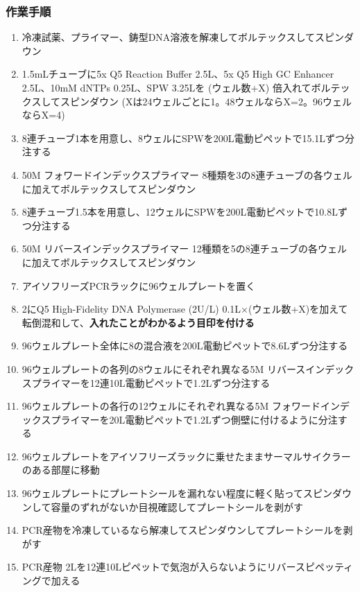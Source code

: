 \documentclass[titlepage,10pt,a4paper,uplatex]{jsbook}
\renewcommand{\textbf}[1]{{\bfseries\sffamily#1}}
\begin{document}
\subsubsection{作業手順}
\begin{enumerate}
\item 冷凍試薬、プライマー、鋳型DNA溶液を解凍してボルテックスしてスピンダウン
\item 1.5mLチューブに5x Q5 Reaction Buffer 2.5{\textmu}L、5x Q5 High GC Enhancer 2.5{\textmu}L、10mM dNTPs 0.25{\textmu}L、SPW 3.25{\textmu}Lを (ウェル数+X) 倍入れてボルテックスしてスピンダウン (Xは24ウェルごとに1。48ウェルならX=2。96ウェルならX=4)
\item 8連チューブ1本を用意し、8ウェルにSPWを200{\textmu}L電動ピペットで15.1{\textmu}Lずつ分注する
\item 50{\textmu}M フォワードインデックスプライマー 8種類を3の8連チューブの各ウェルに加えてボルテックスしてスピンダウン
\item 8連チューブ1.5本を用意し、12ウェルにSPWを200{\textmu}L電動ピペットで10.8{\textmu}Lずつ分注する
\item 50{\textmu}M リバースインデックスプライマー 12種類を5の8連チューブの各ウェルに加えてボルテックスしてスピンダウン
\item アイソフリーズPCRラックに96ウェルプレートを置く
\item 2にQ5 High-Fidelity DNA Polymerase (2U/{\textmu}L) 0.1{\textmu}L×(ウェル数+X)を加えて転倒混和して、\textbf{入れたことがわかるよう目印を付ける}
\item 96ウェルプレート全体に8の混合液を200{\textmu}L電動ピペットで8.6{\textmu}Lずつ分注する
\item 96ウェルプレートの各列の8ウェルにそれぞれ異なる5{\textmu}M リバースインデックスプライマーを12連10{\textmu}L電動ピペットで1.2{\textmu}Lずつ分注する
\item 96ウェルプレートの各行の12ウェルにそれぞれ異なる5{\textmu}M フォワードインデックスプライマーを20{\textmu}L電動ピペットで1.2{\textmu}Lずつ側壁に付けるように分注する
\item 96ウェルプレートをアイソフリーズラックに乗せたままサーマルサイクラーのある部屋に移動
\item 96ウェルプレートにプレートシールを漏れない程度に軽く貼ってスピンダウンして容量のずれがないか目視確認してプレートシールを剥がす
\item PCR産物を冷凍しているなら解凍してスピンダウンしてプレートシールを剥がす
\item PCR産物 2{\textmu}Lを12連10{\textmu}Lピペットで気泡が入らないようにリバースピペッティングで加える

\end{enumerate}
\end{document}
